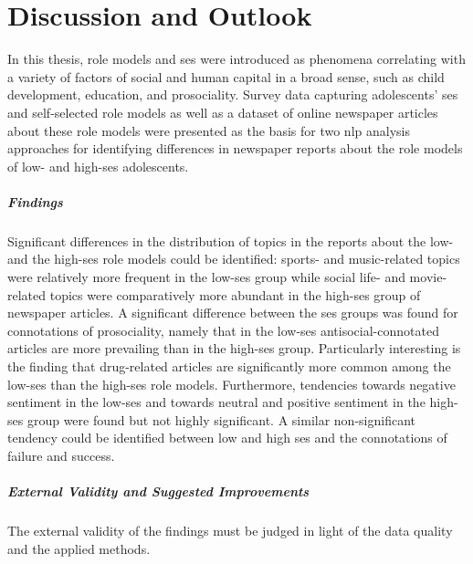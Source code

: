 \renewcommand{\imagepath}{../80-outro/img}

\chapter{Discussion and Outlook}
In this thesis, role models and \gls{ses} were introduced as phenomena correlating with a variety of factors of social and human capital in a broad sense, such as child development, education, and prosociality. Survey data capturing adolescents' \gls{ses} and self-selected role models as well as a dataset of online newspaper articles about these role models were presented as the basis for two \gls{nlp} analysis approaches for identifying differences in newspaper reports about the role models of low- and high-\gls{ses} adolescents.

\paragraph{Findings}
Significant differences in the distribution of topics in the reports about the low- and the high-\gls{ses} role models could be identified: sports- and music-related topics were relatively more frequent in the low-\gls{ses} group while social life- and movie-related topics were comparatively more abundant in the high-\gls{ses} group of newspaper articles. A significant difference between the \gls{ses} groups was found for connotations of prosociality, namely that in the low-\gls{ses} antisocial-connotated articles are more prevailing than in the high-\gls{ses} group. Particularly interesting is the finding that drug-related articles are significantly more common among the low-\gls{ses} than the high-\gls{ses} role models. Furthermore, tendencies towards negative sentiment in the low-\gls{ses} and towards neutral and positive sentiment in the high-\gls{ses} group were found but not highly significant. A similar non-significant tendency could be identified between low and high \gls{ses} and the connotations of failure and success.

\paragraph{External Validity and Suggested Improvements}
The external validity of the findings must be judged in light of the data quality and the applied methods.

